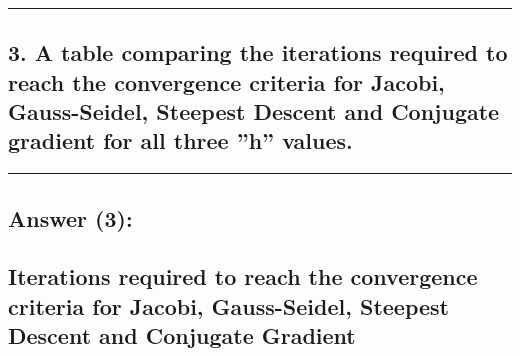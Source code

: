 \documentclass[11pt]{article}
\begin{document}
    \begin{center}
    \end{center}
    { \hspace*{\fill} \\}
    
    \begin{center}
    \end{center}
    { \hspace*{\fill} \\}
    
    \begin{center}
    \end{center}
    { \hspace*{\fill} \\}
    
    \begin{center}\rule{0.5\linewidth}{0.5pt}\end{center}

    \hypertarget{a-table-comparing-the-iterations-required-to-reach-the-convergence-criteria-for-jacobi-gauss-seidel-steepest-descent-and-conjugate-gradient-for-all-three-h-values.}{%
\subsection{3. A table comparing the iterations required to reach the
convergence criteria for Jacobi, Gauss-Seidel, Steepest Descent and
Conjugate gradient for all three ''h''
values.}\label{a-table-comparing-the-iterations-required-to-reach-the-convergence-criteria-for-jacobi-gauss-seidel-steepest-descent-and-conjugate-gradient-for-all-three-h-values.}}

    \begin{center}\rule{0.5\linewidth}{0.5pt}\end{center}

    \hypertarget{answer-3}{%
\subsection{Answer (3):}\label{answer-3}}

    \hypertarget{iterations-required-to-reach-the-convergence-criteria-for-jacobi-gauss-seidel-steepest-descent-and-conjugate-gradient}{%
\subsection{Iterations required to reach the convergence criteria for
Jacobi, Gauss-Seidel, Steepest Descent and Conjugate
Gradient}\label{iterations-required-to-reach-the-convergence-criteria-for-jacobi-gauss-seidel-steepest-descent-and-conjugate-gradient}}
\end{document}
